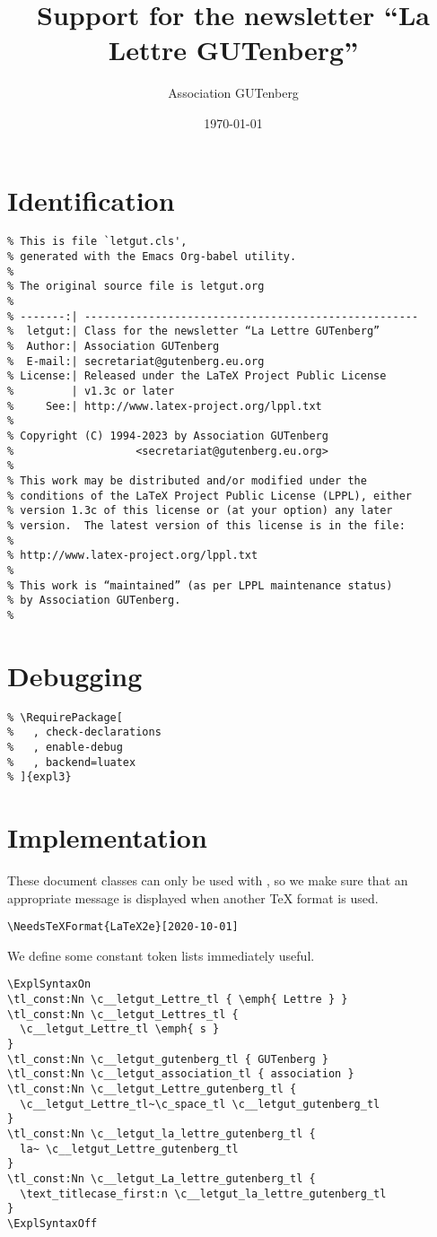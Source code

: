 \documentclass{letgut}
\author{Association GUTenberg}
\date{\today}
\title{Support for the newsletter “La Lettre GUTenberg”}
\begin{document}
\section{Identification}
\label{Identification-mn5g55h0jlj0}
\begin{lstlisting}
% This is file `letgut.cls',
% generated with the Emacs Org-babel utility.
%
% The original source file is letgut.org
%
% -------:| ----------------------------------------------------
%  letgut:| Class for the newsletter “La Lettre GUTenberg”
%  Author:| Association GUTenberg
%  E-mail:| secretariat@gutenberg.eu.org
% License:| Released under the LaTeX Project Public License
%         | v1.3c or later
%     See:| http://www.latex-project.org/lppl.txt
%
% Copyright (C) 1994-2023 by Association GUTenberg
%                   <secretariat@gutenberg.eu.org>
%
% This work may be distributed and/or modified under the
% conditions of the LaTeX Project Public License (LPPL), either
% version 1.3c of this license or (at your option) any later
% version.  The latest version of this license is in the file:
%
% http://www.latex-project.org/lppl.txt
%
% This work is “maintained” (as per LPPL maintenance status)
% by Association GUTenberg.
%
\end{lstlisting}

\section{Debugging}
\label{Debugging-846g55h0jlj0}
\begin{lstlisting}
% \RequirePackage[
%   , check-declarations
%   , enable-debug
%   , backend=luatex
% ]{expl3}
\end{lstlisting}

\section{Implementation}
\label{Implementation-vy6g55h0jlj0}
These document classes can only be used with \LaTeXe, so we make
sure that an appropriate message is displayed when another \TeX{}
format is used.

\begin{lstlisting}
\NeedsTeXFormat{LaTeX2e}[2020-10-01]
\end{lstlisting}

We define some constant token lists immediately useful.

\begin{lstlisting}
\ExplSyntaxOn
\tl_const:Nn \c__letgut_Lettre_tl { \emph{ Lettre } }
\tl_const:Nn \c__letgut_Lettres_tl {
  \c__letgut_Lettre_tl \emph{ s }
}
\tl_const:Nn \c__letgut_gutenberg_tl { GUTenberg }
\tl_const:Nn \c__letgut_association_tl { association }
\tl_const:Nn \c__letgut_Lettre_gutenberg_tl {
  \c__letgut_Lettre_tl~\c_space_tl \c__letgut_gutenberg_tl
}
\tl_const:Nn \c__letgut_la_lettre_gutenberg_tl {
  la~ \c__letgut_Lettre_gutenberg_tl
}
\tl_const:Nn \c__letgut_La_lettre_gutenberg_tl {
  \text_titlecase_first:n \c__letgut_la_lettre_gutenberg_tl
}
\ExplSyntaxOff
\end{lstlisting}
\end{document}
